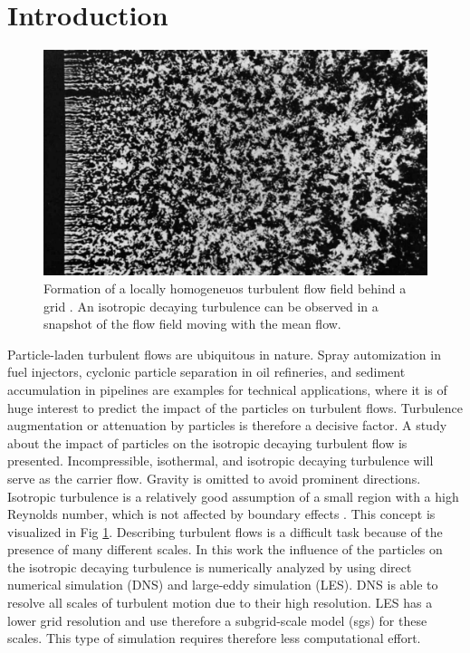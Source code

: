 \documentclass[11pt,a4paper,openany,oneside,parskip=half*]{article}
\begin{document}
\section{Introduction}
\setcounter{page}{1}
\begin{figure}[h]
	\centering
  \includegraphics[width=\textwidth]{./Abbildungen/TurbulentMotion_Introduction.png}
  \captionsetup{width=0.97\linewidth}
	\caption{Formation of a locally homogeneuos turbulent flow field behind a grid \cite{albumOfFluidMotion}. An isotropic decaying turbulence can be observed in a snapshot of the flow field moving with the mean flow.}
	\label{introduction_picture}
\end{figure}
Particle-laden turbulent flows are ubiquitous in nature.
Spray automization in fuel injectors, cyclonic particle separation in oil refineries, and sediment accumulation in pipelines are examples for technical applications, where it is of huge interest to predict the impact of the particles on turbulent flows.
Turbulence augmentation or attenuation by particles is therefore a decisive factor.
\newline
A study about the impact of particles on the isotropic decaying turbulent flow is presented.
Incompressible, isothermal, and isotropic decaying turbulence will serve as the carrier flow. Gravity is omitted to avoid prominent directions. Isotropic turbulence is a relatively good assumption of a small region with a high Reynolds number, which is not affected by boundary effects \cite{Kolmogorov1941}. This concept is visualized in Fig \ref{introduction_picture}. Describing turbulent flows is a difficult task because of the presence of many different scales.
\newline
In this work the influence of the particles on the isotropic decaying turbulence is numerically analyzed by using direct numerical simulation (DNS) and large-eddy simulation (LES). DNS is able to resolve all scales of turbulent motion due to their high resolution. LES has a lower grid resolution and use therefore a subgrid-scale model (sgs) for these scales. This type of simulation requires therefore less computational effort.
\end{document}
